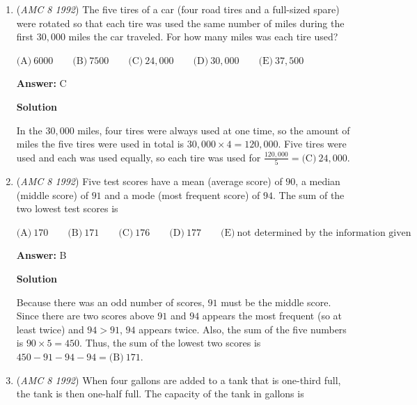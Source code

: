 \begin{enumerate}
 \textbf{Answer: }B



\textbf{Solution}

The total frequency is $50+60+40+60+40=250$, with the blue frequency of $60$. Therefore, the precentage that preferred blue is $\frac{60}{250}=\boxed{\text{(B)}\ 24\%}$.

 


 


	\item (\textit{AMC 8 1992}) The five tires of a car (four road tires and a full-sized spare) were rotated so that each tire was used the same number of miles during the first $30,000$ miles the car traveled.  For how many miles was each tire used?


 $\text{(A)}\ 6000 \qquad \text{(B)}\ 7500 \qquad \text{(C)}\ 24,000 \qquad \text{(D)}\ 30,000 \qquad \text{(E)}\ 37,500$

 \textbf{Answer: }C



\textbf{Solution}

In the $30,000$ miles, four tires were always used at one time, so the amount of miles the five tires were used in total is $30,000 \times 4=120,000$. Five tires were used and each was used equally, so each tire was used for $\frac{120,000}{5}=\boxed{\text{(C)}\ 24,000}$.

 


	\item (\textit{AMC 8 1992}) Five test scores have a mean (average score) of $90$, a median (middle score) of $91$ and a mode (most frequent score) of $94$.  The sum of the two lowest test scores is


 $\text{(A)}\ 170 \qquad \text{(B)}\ 171 \qquad \text{(C)}\ 176 \qquad \text{(D)}\ 177 \qquad \text{(E)}\ \text{not determined by the information given}$

 \textbf{Answer: }B



\textbf{Solution}

Because there was an odd number of scores, $91$ must be the middle score. Since there are two scores above $91$ and $94$ appears the most frequent (so at least twice) and $94>91$, $94$ appears twice. Also, the sum of the five numbers is $90 \times 5 =450$. Thus, the sum of the lowest two scores is $450-91-94-94= \boxed{\text{(B)}\ 171}$.

 


	\item (\textit{AMC 8 1992}) When four gallons are added to a tank that is one-third full, the tank is then one-half full.  The capacity of the tank in gallons is



\end{enumerate}
